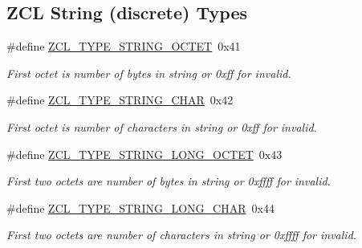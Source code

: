 \subsection*{Z\+CL String (discrete) Types}
\begin{DoxyCompactItemize}
\item 
\mbox{\label{group__zcl__types_ga7cd063b0a77ca0286b0dcc177e4251c5}} 
\#define \hyperlink{group__zcl__types_ga7cd063b0a77ca0286b0dcc177e4251c5}{Z\+C\+L\+\_\+\+T\+Y\+P\+E\+\_\+\+S\+T\+R\+I\+N\+G\+\_\+\+O\+C\+T\+ET}~0x41
\begin{DoxyCompactList}\small\item\em First octet is number of bytes in string or 0xff for invalid. \end{DoxyCompactList}\item 
\#define \hyperlink{group__zcl__types_ga64286e0c69e0ed344a6eb8756ac81f95}{Z\+C\+L\+\_\+\+T\+Y\+P\+E\+\_\+\+S\+T\+R\+I\+N\+G\+\_\+\+C\+H\+AR}~0x42
\begin{DoxyCompactList}\small\item\em First octet is number of characters in string or 0xff for invalid. \end{DoxyCompactList}\item 
\#define \hyperlink{group__zcl__types_ga567563a365e2dddaced101de02fd9128}{Z\+C\+L\+\_\+\+T\+Y\+P\+E\+\_\+\+S\+T\+R\+I\+N\+G\+\_\+\+L\+O\+N\+G\+\_\+\+O\+C\+T\+ET}~0x43
\begin{DoxyCompactList}\small\item\em First two octets are number of bytes in string or 0xffff for invalid. \end{DoxyCompactList}\item 
\#define \hyperlink{group__zcl__types_gabb23537eaae74cc55233355c6ce5979e}{Z\+C\+L\+\_\+\+T\+Y\+P\+E\+\_\+\+S\+T\+R\+I\+N\+G\+\_\+\+L\+O\+N\+G\+\_\+\+C\+H\+AR}~0x44
\begin{DoxyCompactList}\small\item\em First two octets are number of characters in string or 0xffff for invalid. \end{DoxyCompactList}\end{DoxyCompactItemize}
